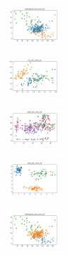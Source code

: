 \begin{figure}[H]
\begin{subfigure}
    \end{subfigure}
    \hfill
    \begin{subfigure}
        \centering
        \includegraphics[width=0.234\textwidth]{img/bl/newthyroid_set_const_20_277451237_clust.png}
    \end{subfigure}
    \hfill
    \begin{subfigure}
        \centering
        \includegraphics[width=0.234\textwidth]{img/bl/iris_set_const_20_49258669_clust.png}
    \end{subfigure}
    \hfill
    \begin{subfigure}
        \centering
        \includegraphics[width=0.234\textwidth]{img/bl/ecoli_set_const_20_49258669_clust.png}
    \end{subfigure}
    \hfill
    \begin{subfigure}
        \centering
        \includegraphics[width=0.234\textwidth]{img/bl/rand_set_const_20_49258669_clust.png}
    \end{subfigure}
    \hfill
    \begin{subfigure}
        \centering
        \includegraphics[width=0.234\textwidth]{img/bl/newthyroid_set_const_20_49258669_clust.png}
    \end{subfigure}
    \hfill
    \begin{subfigure}

\end{subfigure}
\end{figure}
